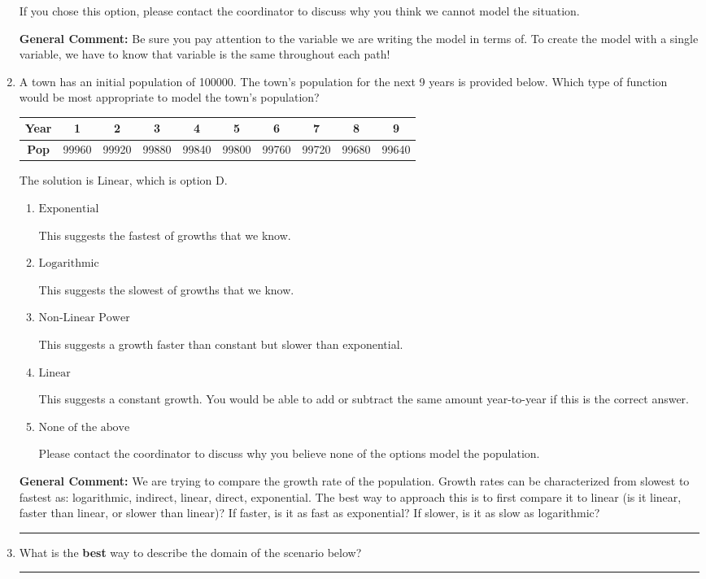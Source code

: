 \documentclass{extbook}[14pt]
\newcommand{\litem}[1]{\item #1

\rule{\textwidth}{0.4pt}}
\begin{document}
\begin{enumerate}
{\begin{enumerate}[label=\Alph*.]
If you chose this option, please contact the coordinator to discuss why you think we cannot model the situation.
\end{enumerate}

\textbf{General Comment:} Be sure you pay attention to the variable we are writing the model in terms of. To create the model with a single variable, we have to know that variable is the same throughout each path!
}
\litem{
A town has an initial population of 100000. The town's population for the next 9 years is provided below. Which type of function would be most appropriate to model the town's population?


\begin{tabular}{c|c|c|c|c|c|c|c|c|c}
\textbf{Year} &1 &2 &3 &4 &5 &6 &7 &8 &9\tabularnewline \hline
\textbf{Pop} &99960 &99920 &99880 &99840 &99800 &99760 &99720 &99680 &99640\end{tabular}The solution is \( \text{Linear} \), which is option D.\begin{enumerate}[label=\Alph*.]
\item \( \text{Exponential} \)

This suggests the fastest of growths that we know.
\item \( \text{Logarithmic} \)

This suggests the slowest of growths that we know.
\item \( \text{Non-Linear Power} \)

This suggests a growth faster than constant but slower than exponential.
\item \( \text{Linear} \)

This suggests a constant growth. You would be able to add or subtract the same amount year-to-year if this is the correct answer.
\item \( \text{None of the above} \)

Please contact the coordinator to discuss why you believe none of the options model the population.
\end{enumerate}

\textbf{General Comment:} We are trying to compare the growth rate of the population. Growth rates can be characterized from slowest to fastest as: logarithmic, indirect, linear, direct, exponential. The best way to approach this is to first compare it to linear (is it linear, faster than linear, or slower than linear)? If faster, is it as fast as exponential? If slower, is it as slow as logarithmic?
}
\litem{
What is the \textbf{best} way to describe the domain of the scenario below?

}
\end{enumerate}
\end{document}
